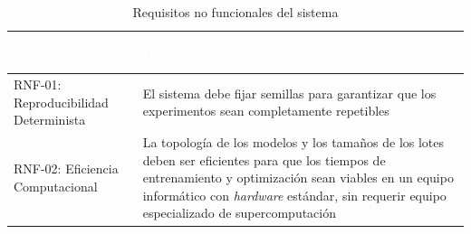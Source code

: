 \begin{table}[htp]
	\centering
	\renewcommand{\arraystretch}{1.3}
		\begin{tabular}{ | m{7cm} | m{8cm} | }
			\hline
			\rowcolor[HTML]{5B9BD5} 
			\textcolor{white}{\textbf{Requisito No Funcional}} & \textcolor{white}{\textbf{Descripción}}\\
			\hline
			
			RNF-01: Reproducibilidad Determinista & El sistema debe fijar semillas para garantizar que los experimentos sean completamente repetibles \\
			\hline
			RNF-02: Eficiencia Computacional & La topología de los modelos y los tamaños de los lotes deben ser eficientes para que los tiempos de entrenamiento y optimización sean viables en un equipo informático con \textit{hardware} estándar, sin requerir equipo especializado de supercomputación \\
			\hline
			
		\end{tabular} 
		
		\caption{Requisitos no funcionales del sistema}
	\end{table}